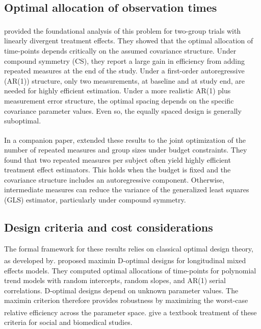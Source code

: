 \documentclass[
  11pt,
]{article}
\begin{document}
\subsection{Optimal allocation of observation times}\label{optimal-allocation-of-observation-times}

\textsuperscript{} provided the foundational
analysis of this problem for two-group trials with linearly
divergent treatment effects. They showed that the optimal
allocation of time-points depends critically on the assumed
covariance structure. Under compound symmetry (CS), they report a
large gain in efficiency from adding repeated measures at the end
of the study. Under a first-order autoregressive (AR(1)) structure, only two
measurements, at baseline and at study end, are needed for
highly efficient estimation. Under a more realistic AR(1) plus
measurement error structure, the optimal spacing depends on the
specific covariance parameter values. Even so, the equally spaced
design is generally suboptimal.

In a companion paper,\textsuperscript{} extended
these results to the joint optimization of the number of repeated
measures and group sizes under budget constraints. They found
that two repeated measures per subject often yield highly
efficient treatment effect estimators. This holds when the budget
is fixed and the covariance structure includes an autoregressive
component. Otherwise, intermediate measures can reduce the
variance of the generalized least squares (GLS) estimator,
particularly under compound symmetry.

\subsection{Design criteria and cost considerations}\label{design-criteria-and-cost-considerations}

The formal framework for these results relies on classical
optimal design theory, as developed by\textsuperscript{}.\textsuperscript{} proposed maximin D-optimal designs for
longitudinal mixed effects models. They computed optimal
allocations of time-points for polynomial trend models with
random intercepts, random slopes, and AR(1) serial correlations.
D-optimal designs depend on unknown parameter values. The maximin
criterion therefore provides robustness by maximizing the
worst-case relative efficiency across the parameter space.\textsuperscript{} give a textbook treatment of these
criteria for social and biomedical studies.
\end{document}
